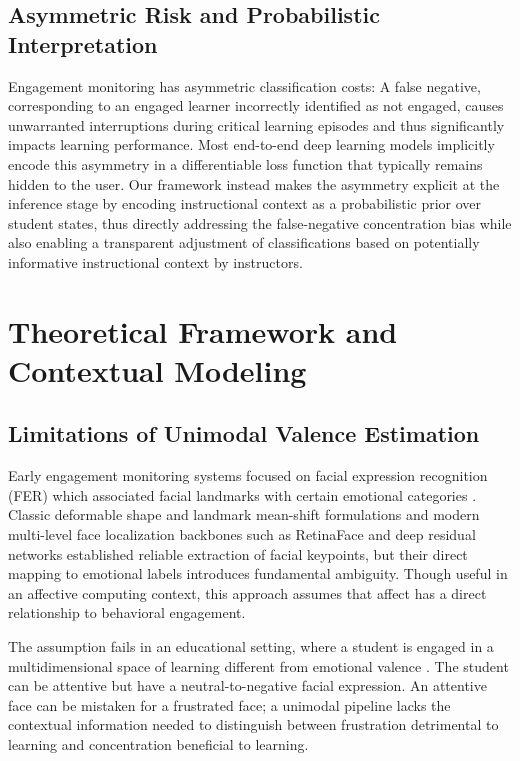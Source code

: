 \documentclass[conference]{IEEEtran}
\begin{document}
\subsection{Asymmetric Risk and Probabilistic Interpretation}
Engagement monitoring has asymmetric classification costs: A false negative, corresponding to an engaged learner incorrectly identified as not engaged, causes unwarranted interruptions during critical learning episodes and thus significantly impacts learning performance. Most end-to-end deep learning models implicitly encode this asymmetry in a differentiable loss function that typically remains hidden to the user. Our framework instead makes the asymmetry explicit at the inference stage by encoding instructional context as a probabilistic prior over student states, thus directly addressing the false-negative concentration bias while also enabling a transparent adjustment of classifications based on potentially informative instructional context by instructors.

\section{Theoretical Framework and Contextual Modeling}

\subsection{Limitations of Unimodal Valence Estimation}
Early engagement monitoring systems focused on facial expression recognition (FER) which associated facial landmarks with certain emotional categories \cite{b1, b2}. Classic deformable shape and landmark mean-shift formulations \cite{b3} and modern multi-level face localization backbones such as RetinaFace \cite{b12} and deep residual networks \cite{b17} established reliable extraction of facial keypoints, but their direct mapping to emotional labels introduces fundamental ambiguity. Though useful in an affective computing context, this approach assumes that affect has a direct relationship to behavioral engagement.

The assumption fails in an educational setting, where a student is engaged in a multidimensional space of learning different from emotional valence \cite{b7, b8}. The student can be attentive but have a neutral-to-negative facial expression. An attentive face can be mistaken for a frustrated face; a unimodal pipeline lacks the contextual information needed to distinguish between frustration detrimental to learning and concentration beneficial to learning.
\end{document}
